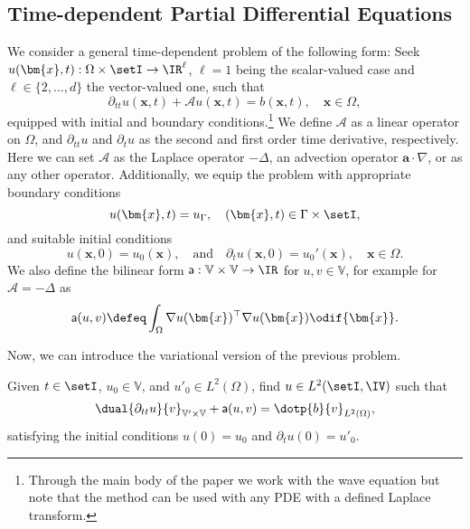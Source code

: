 \subsection{Time-dependent Partial Differential Equations} \label{eq:time_dependent_pdes}

We consider a general time-dependent problem of the following form: Seek  $u(\bm{x},t):\Omega\times\setI \to \IR^\ell$, $\ell =1$ being the scalar-valued case and $\ell\in\{2,\dots,d\}$ the vector-valued one, such that
\begin{equation} \label{eq:prob}
	\partial_{tt} u(\bm{x},t) + \mathcal{A}  u(\bm{x},t) = b(\bm{x},t), \quad \bm{x} \in \Omega,
\end{equation}
equipped with initial and boundary conditions.\footnote{Through the main body of the paper we work with the wave equation but note that the method can be used with any PDE with a defined Laplace transform.}
We define $\mathcal{A}$ as a linear operator on $\Omega$, and $\partial_{tt} u$ and $\partial_t u$ as the second and first order time derivative, respectively. Here we can set $\mathcal{A}$ as the Laplace operator $-\Delta$, an advection operator $\bm{a} \cdot \nabla$, or as any other operator. Additionally, we equip the problem with appropriate boundary conditions
\begin{equation}
	u(\bm{x},t) = u_{\Gamma}, \quad (\bm{x},t) \in \Gamma \times \setI,
\end{equation}
and suitable initial conditions
\begin{equation}
	u(\bm{x},0) = u_0(\bm{x}), \quad \text{and} \quad \partial_t u(\bm{x},0) = u_0'(\bm{x}), \quad \bm{x} \in \Omega.
\end{equation}
We also define the bilinear form $\mathsf{a}: \mathbb{V} \times \mathbb{V} \rightarrow \IR$ for $u,v \in \mathbb{V}$, for example for $\mathcal{A}=-\Delta$ as
\begin{align}
	\mathsf{a}(u,v) \defeq \int_{\Omega} \nabla u(\bm{x})^\top \nabla u(\bm{x}) \odif{\bm{x}}.
\end{align}

Now, we can introduce the variational version of the previous problem.
\begin{problem} \label{pbm:weak_problem}
Given $t \in \setI$, $u_0 \in \mathbb{V}$, and $u'_0 \in L^2(\Omega)$, find $u \in L^2(\setI,\IV)$ such that
\begin{align}
	\dual{\partial_{tt}u}{v}_{\mathbb{V}' \times \mathbb{V}} + \mathsf{a}(u,v) = \dotp{b}{v}_{L^2(\Omega)},
\end{align}
satisfying the initial conditions $u(0) = u_0$ and $\partial_t u(0) = u'_0$.
\end{problem}


